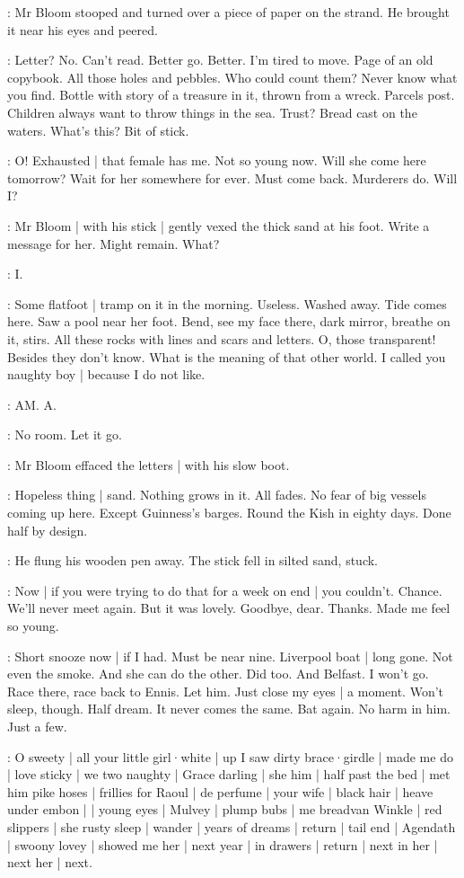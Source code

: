:
Mr Bloom stooped
and turned over a piece of paper
on the strand.
He brought it near his eyes and peered.

\Bloom:
Letter?
No.
Can't read.
Better go.
Better.
I'm tired to move.
Page of an old copybook.
All those holes and pebbles.
Who could count them?
Never know what you find.
Bottle with story of a treasure in it,
thrown from a wreck.%
Parcels post.
Children always want to throw things in the sea.
Trust?
Bread cast on the waters.
What's this?
Bit of stick.

\Bloom:
O!
Exhausted |
that female has me.
Not so young now.
Will she come here tomorrow?
Wait for her somewhere for ever.
Must come back.
Murderers do.
Will I?

:
Mr Bloom |
with his stick |
gently vexed the thick sand at his foot.
Write a message for her.
Might remain.
What?

\Bloom:
I.

\Bloom:
Some flatfoot |
tramp on it in the morning.
Useless.
Washed away.
Tide comes here.%
Saw a pool near her foot.
Bend,
see my face there,
dark mirror,
breathe on it,
stirs.
All these rocks
with lines and scars and letters.
O,
those transparent!
Besides
they don't know.
What is the meaning of that other world.
I called you naughty boy |
because I do not like.

\Bloom:
AM.
A.

\Bloom:
No room.
Let it go.

:
Mr Bloom effaced the letters |
with his slow boot.

\Bloom:
Hopeless thing |
sand.
Nothing grows in it.
All fades.
No fear of big vessels coming up here.
Except Guinness's barges.
Round the Kish in eighty days.
Done half by design.

:
He flung his wooden pen away.%
The stick fell in silted sand,
stuck.

\Bloom:
Now |
if you were trying to do that for a week on end |
you couldn't.
Chance.
We'll never meet again.
But it was lovely.
Goodbye,
dear.
Thanks.
Made me feel so young.

\Bloom:
Short snooze now |
if I had.
Must be near nine.
Liverpool boat |
long gone.
Not even the smoke.
And she can do the other.
Did too.
And Belfast.
I won't go.
Race there,
race back to Ennis.
Let him.
Just close my eyes |
a moment.
Won't sleep,
though.
Half dream.
It never comes the same.
Bat again.
No harm in him.
Just a few.

\Bloom:
O sweety |
all your little girl·white |
up I saw dirty brace·girdle |
made me do |
love sticky |
we two naughty |
Grace darling |%
she him |
half past the bed |
met him pike hoses |
frillies for Raoul |
de perfume |
your wife |
black hair |
heave under embon |
 |
young eyes |
Mulvey |
plump bubs |
me breadvan Winkle |
red slippers |
she rusty sleep |
wander |
years of dreams |
return |
tail end |
Agendath |
swoony lovey |
showed me her |
next year |
in drawers |
return |
next in her |
next her |
next.

